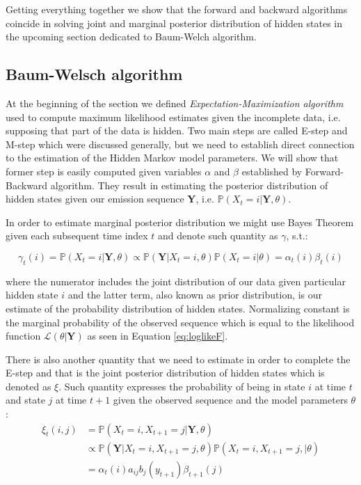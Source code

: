 Getting everything together we show that the forward and backward algorithms coincide in solving joint and marginal posterior distribution 
of hidden states in the upcoming section dedicated to Baum-Welch algorithm.

\subsection{Baum-Welsch algorithm}

At the beginning of the section we defined \textit{Expectation-Maximization algorithm} used to compute maximum likelihood estimates given the incomplete data, 
i.e. supposing that part of the data is hidden. Two main steps are called E-step and M-step which were discussed generally, 
but we need to establish direct connection to the estimation of the Hidden Markov model parameters. 
We will show that former step is easily computed given variables $\alpha$ and $\beta$ established by Forward-Backward algorithm. 
They result in estimating the posterior distribution of hidden states given our emission sequence \textbf{Y}, i.e. $\mathbb{P}(X_t=i|\textbf{Y},\theta)$. 

In order to estimate marginal posterior distribution we might use Bayes Theorem given each subsequent time index $t$ and denote such quantity as $\gamma$, s.t.: 

\begin{equation} \label{eq:gamma}
    \gamma_t(i) = \mathbb{P}(X_t=i|\textbf{Y},\theta) \propto \mathbb{P}(\textbf{Y}|X_t=i, \theta) \mathbb{P}(X_t = i|\theta) = \alpha_t(i) \beta_t(i)
\end{equation}

where the numerator includes the joint distribution of our data given particular hidden state $i$ and the latter term, also known as prior distribution, 
is our estimate of the probability distribution of hidden states. Normalizing constant is the marginal probability of the observed sequence 
which is equal to the likelihood function $\mathcal{L}(\theta|\textbf{Y})$ as seen in Equation \ref{eq:loglikeF}.

There is also another quantity that we need to estimate in order to complete the E-step and that is the joint posterior distribution of hidden states which is denoted as $\xi$.
Such quantity expresses the probability of being in state $i$ at time $t$ and state $j$ at time $t+1$ given the observed sequence and the model parameters $\theta$:
\begin{align} \label{eq:xi}
    \xi_t(i,j) & = \mathbb{P}(X_t=i, X_{t+1}=j|\textbf{Y},\theta) \\ \nonumber
               & \propto \mathbb{P}(\textbf{Y}|X_t=i, X_{t+1}=j,\theta) \mathbb{P}(X_t=i, X_{t+1}=j,|\theta) \\ \nonumber
               & = \alpha_t(i) a_{ij} b_j(y_{t+1}) \beta_{t+1}(j)
\end{align}

